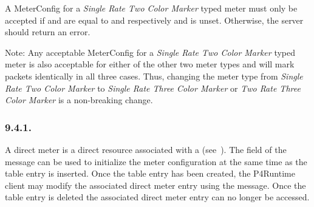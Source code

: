 \documentclass[11pt]{article}
\begin{document}
{%
A MeterConfig for a \emph{Single Rate Two Color Marker} typed meter must only be
accepted if  and  are equal to  and  respectively and
 is unset. Otherwise, the server should return an 
error.%

Note: Any acceptable MeterConfig for a \emph{Single Rate Two Color Marker} typed
meter is also acceptable for either of the other two meter types and will mark
packets identically in all three cases. Thus, changing the meter type from
\emph{Single Rate Two Color Marker} to \emph{Single Rate Three Color Marker} or
\emph{Two Rate Three Color Marker} is a non-breaking change.%

\subsubsection{9.4.1.\hspace*{0.5em}}\label{sec-directmeterentry}%

\noindent{}A direct meter is a direct resource associated with a  (see~). The  field of the 
message can be used to initialize the meter configuration at the same time as
the table entry is inserted. Once the table entry has been created, the
P4Runtime client may modify the associated direct meter entry using the
 message. Once the table entry is deleted the associated
direct meter entry can no longer be accessed.%

}
\end{document}
